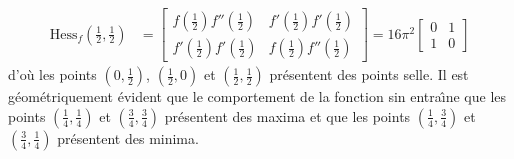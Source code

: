 {\begin{enumerate}
{\begin{align*}
\\
\mathrm{Hess}_f(\tfrac 12,\tfrac 12)&=\left[\begin{matrix} 
f(\tfrac 12) f''(\tfrac 12) &  f'(\tfrac 12) f'(\tfrac 12)\\  f'(\tfrac 12) f'(\tfrac 12) & f(\tfrac 12)  f''(\tfrac 12)
\end{matrix}\right]=16 \pi^2\left[\begin{matrix} 
0 &  1\\  1 & 0
\end{matrix}\right]
\end{align*}
d'o\`u les points $(0,\frac 12)$, $(\tfrac 12,0)$ et $(\tfrac 12,\tfrac 12)$
pr\'esentent des points selle.
Il est g\'eo\-m\'etri\-quement 
\'evident que le comportement de la fonction sin entra\^\i ne
que les points $(\tfrac 14,\tfrac 14)$ et  $(\tfrac 34,\tfrac 34)$
pr\'esentent des maxima et que les points
$(\tfrac 14,\tfrac 34)$ et  $(\tfrac 34,\tfrac 14)$
pr\'esentent des minima.}
\end{enumerate}
}
